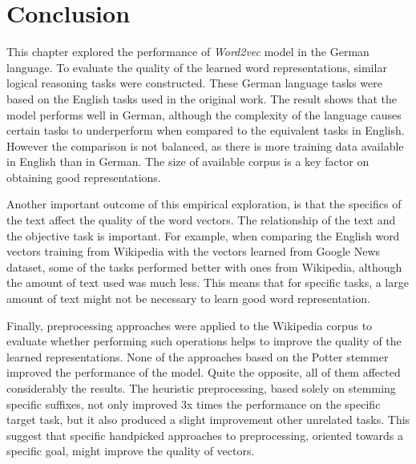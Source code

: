 


\section{Conclusion}
\label{sec:conclusion_and_future_work}   

This chapter explored the performance of \textit{Word2vec} model in the German
language. To evaluate the quality of the learned  word representations,  similar
logical reasoning tasks were constructed. These German language tasks were
based on the English tasks used in the original work. 
The result shows that the model performs well in German, although the complexity of the
language causes certain tasks to underperform when compared to the equivalent
tasks in English. However the comparison is not  balanced, as there is more
training data available in English than in German. The size of available corpus is a key factor on obtaining good representations.

Another important outcome of this  empirical exploration, is that the specifics
of the text affect the quality of the word vectors. The
relationship of the text and the objective task is important.  For example,
when comparing the English word vectors training from  Wikipedia with the
vectors learned from  Google News dataset, some of the tasks performed better
with ones from Wikipedia,  although the amount of text used was  much less.
This means that for specific tasks, a large amount of text might not be
necessary to learn  good word representation.

Finally,  preprocessing approaches were applied to the Wikipedia
corpus to evaluate whether performing such operations  helps to improve the quality of
the learned representations. None  of the  approaches based on the Potter
stemmer improved the
performance of the model. Quite the opposite, all of them affected
considerably the results.
The heuristic preprocessing, based solely on stemming specific suffixes,  not
only improved  3x times the performance on the specific target task, 
but it also produced a slight improvement other unrelated tasks. This suggest that specific
handpicked approaches to preprocessing, oriented towards a specific goal,  might improve  the quality of
vectors.

